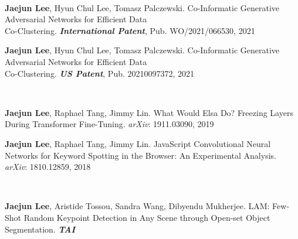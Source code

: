\hfill

\\
\begin{cvenumerate}[10]\vspace*{-0.15cm}
\item \hypertarget{CI-GAN:International}{\textcolor{gray!99!black}{\textbf{Jaejun Lee}}, Hyun Chul Lee, Tomasz Palczewski. Co-Informatic Generative Adversarial Networks for Efficient Data \\Co-Clustering. \textbf{\textit{International Patent}}, Pub. WO/2021/066530, 2021}
\item \hypertarget{CI-GAN:US}{\textcolor{gray!99!black}{\textbf{Jaejun Lee}}, Hyun Chul Lee, Tomasz Palczewski. Co-Informatic Generative Adversarial Networks for Efficient Data \\Co-Clustering. \textbf{\textit{US Patent}}, Pub. 20210097372, 2021}
\end{cvenumerate}
\hfill

\\
\begin{cvenumerate}[12]\vspace*{-0.15cm}
\item \hypertarget{Elsa:arXiv}{\textcolor{gray!99!black}{\textbf{Jaejun Lee}}, Raphael Tang, Jimmy Lin. What Would Elsa Do? Freezing Layers During Transformer Fine-Tuning. \textit{arXiv}: 1911.03090, 2019}
\item \hypertarget{JavaScript:arXiv}{\textcolor{gray!99!black}{\textbf{Jaejun Lee}}, Raphael Tang, Jimmy Lin. JavaScript Convolutional Neural Networks for Keyword Spotting in the Browser: An Experimental Analysis. \textit{arXiv}: 1810.12859, 2018}
\end{cvenumerate}
\hfill

\\
\begin{cvenumerate}[14]\vspace*{-0.15cm}
\item \hypertarget{LAM:TAI}{\textcolor{gray!99!black}{\textbf{Jaejun Lee}}, Aristide Tossou, Sandra Wang, Dibyendu Mukherjee. LAM: Few-Shot Random Keypoint Detection in Any Scene through Open-set
Object Segmentation. \textbf{\textit{TAI}}}
\end{cvenumerate}